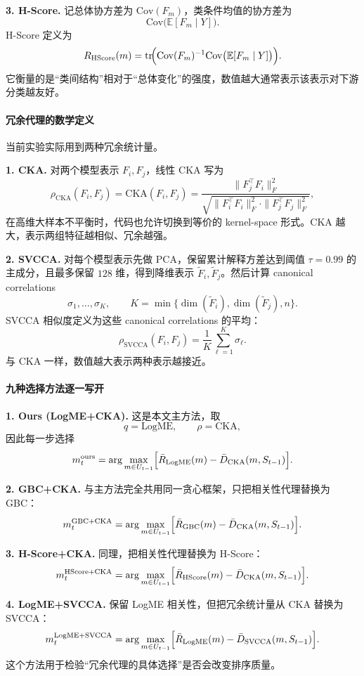 \documentclass[UTF8,fontset=fandol]{ctexart}
\theoremstyle{remark}
\begin{document}
\textbf{3. H-Score.}
记总体协方差为 $\mathrm{Cov}(F_m)$，类条件均值的协方差为
\[
\mathrm{Cov}\bigl(\mathbb E[F_m \mid Y]\bigr).
\]
H-Score 定义为
\[
R_{\mathrm{HScore}}(m)
= \mathrm{tr}\!\Bigl(
\mathrm{Cov}(F_m)^{-1}
\mathrm{Cov}\bigl(\mathbb E[F_m \mid Y]\bigr)
\Bigr).
\]
它衡量的是“类间结构”相对于“总体变化”的强度，数值越大通常表示该表示对下游分类越友好。

\paragraph{冗余代理的数学定义}
当前实验实际用到两种冗余统计量。

\textbf{1. CKA.}
对两个模型表示 $F_i,F_j$，线性 CKA 写为
\[
\rho_{\mathrm{CKA}}(F_i,F_j)
= \mathrm{CKA}(F_i,F_j)
= \frac{\|F_j^\top F_i\|_F^2}
{\sqrt{\|F_i^\top F_i\|_F^2 \cdot \|F_j^\top F_j\|_F^2}},
\]
在高维大样本不平衡时，代码也允许切换到等价的 kernel-space 形式。$\mathrm{CKA}$ 越大，表示两组特征越相似、冗余越强。

\textbf{2. SVCCA.}
对每个模型表示先做 PCA，保留累计解释方差达到阈值 $\tau=0.99$ 的主成分，且最多保留 $128$ 维，得到降维表示 $\widetilde F_i,\widetilde F_j$。然后计算 canonical correlations
\[
\sigma_1,\dots,\sigma_K,
\qquad
K = \min\{\dim(\widetilde F_i), \dim(\widetilde F_j), n\}.
\]
SVCCA 相似度定义为这些 canonical correlations 的平均：
\[
\rho_{\mathrm{SVCCA}}(F_i,F_j)
= \frac{1}{K}\sum_{\ell=1}^K \sigma_\ell.
\]
与 CKA 一样，数值越大表示两种表示越接近。

\paragraph{九种选择方法逐一写开}
\textbf{1. Ours (LogME+CKA).}
这是本文主方法，取
\[
q = \mathrm{LogME}, \qquad \rho = \mathrm{CKA},
\]
因此每一步选择
\[
m_t^{\mathrm{ours}}
= \arg\max_{m \in U_{t-1}}
\Bigl[
\bar R_{\mathrm{LogME}}(m)
- \bar D_{\mathrm{CKA}}(m, S_{t-1})
\Bigr].
\]

\textbf{2. GBC+CKA.}
与主方法完全共用同一贪心框架，只把相关性代理替换为 GBC：
\[
m_t^{\mathrm{GBC+CKA}}
= \arg\max_{m \in U_{t-1}}
\Bigl[
\bar R_{\mathrm{GBC}}(m)
- \bar D_{\mathrm{CKA}}(m, S_{t-1})
\Bigr].
\]

\textbf{3. H-Score+CKA.}
同理，把相关性代理替换为 H-Score：
\[
m_t^{\mathrm{HScore+CKA}}
= \arg\max_{m \in U_{t-1}}
\Bigl[
\bar R_{\mathrm{HScore}}(m)
- \bar D_{\mathrm{CKA}}(m, S_{t-1})
\Bigr].
\]

\textbf{4. LogME+SVCCA.}
保留 LogME 相关性，但把冗余统计量从 CKA 替换为 SVCCA：
\[
m_t^{\mathrm{LogME+SVCCA}}
= \arg\max_{m \in U_{t-1}}
\Bigl[
\bar R_{\mathrm{LogME}}(m)
- \bar D_{\mathrm{SVCCA}}(m, S_{t-1})
\Bigr].
\]
这个方法用于检验“冗余代理的具体选择”是否会改变排序质量。
\end{document}
